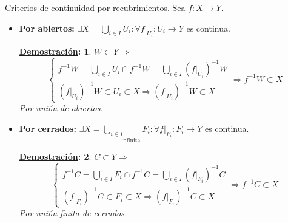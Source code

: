 \documentclass[10pt,a4paper,openright]{book}
\theoremstyle{break}
\newtheorem*{demo}{\underline{Demostración}:}
\begin{document}
\underline{Criterios de continuidad por recubrimientos.} Sea $f: X \rightarrow Y$. 
\begin{itemize}
    \item \textbf{Por abiertos:} $\exists X = \bigcup_{i \in  I} U_i: \forall f|_{U_i} : U_i \rightarrow Y$ es continua. 

    \begin{demo}
    $W \subset Y \Rightarrow$
    \[
    \begin{cases}
        f^{-1}W = \bigcup_{i \in  I} U_i \cap f^{-1} W = \bigcup_{i \in  I} \left( f|_{U_i} \right)^{-1} W\\
        \left( f|_{U_i} \right)^{-1}W \subset U_i \subset X \Rightarrow \left( f|_{U_i} \right)^{-1} W \subset X
    \end{cases}\Rightarrow f^{-1}W \subset X  
    \]
    Por unión de abiertos.
    \end{demo}

    \item \textbf{Por cerrados:} $\exists X = \underbrace{\bigcup_{i \in  I}}_{\text{finita}} F_i: \forall f|_{F_i} : F_i \rightarrow Y$ es continua. 

    \begin{demo}
    $C \subset Y \Rightarrow$
    \[
    \begin{cases}
        f^{-1}C = \bigcup_{i \in  I} F_i \cap f^{-1} C = \bigcup_{i \in  I} \left( f|_{F_i} \right)^{-1} C\\
        \left( f|_{F_i} \right)^{-1}C \subset F_i \subset X \Rightarrow \left( f|_{F_i} \right)^{-1} C \subset X
    \end{cases}\Rightarrow f^{-1}C \subset X  
    \]
    Por unión finita de cerrados.
    \end{demo}
\end{itemize}
\end{document}
